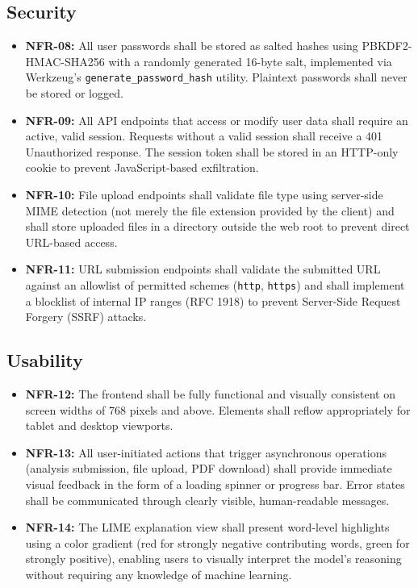 \documentclass[12pt, a4paper]{report}
\begin{document}
\subsection{Security}

\begin{itemize}[noitemsep, leftmargin=2em]
    \item \textbf{NFR-08:} All user passwords shall be stored as salted hashes using PBKDF2-HMAC-SHA256 with a randomly generated 16-byte salt, implemented via Werkzeug's \texttt{generate\_password\_hash} utility. Plaintext passwords shall never be stored or logged.
    \item \textbf{NFR-09:} All API endpoints that access or modify user data shall require an active, valid session. Requests without a valid session shall receive a 401 Unauthorized response. The session token shall be stored in an HTTP-only cookie to prevent JavaScript-based exfiltration.
    \item \textbf{NFR-10:} File upload endpoints shall validate file type using server-side MIME detection (not merely the file extension provided by the client) and shall store uploaded files in a directory outside the web root to prevent direct URL-based access.
    \item \textbf{NFR-11:} URL submission endpoints shall validate the submitted URL against an allowlist of permitted schemes (\texttt{http}, \texttt{https}) and shall implement a blocklist of internal IP ranges (RFC 1918) to prevent Server-Side Request Forgery (SSRF) attacks.
\end{itemize}

\subsection{Usability}

\begin{itemize}[noitemsep, leftmargin=2em]
    \item \textbf{NFR-12:} The frontend shall be fully functional and visually consistent on screen widths of 768 pixels and above. Elements shall reflow appropriately for tablet and desktop viewports.
    \item \textbf{NFR-13:} All user-initiated actions that trigger asynchronous operations (analysis submission, file upload, PDF download) shall provide immediate visual feedback in the form of a loading spinner or progress bar. Error states shall be communicated through clearly visible, human-readable messages.
    \item \textbf{NFR-14:} The LIME explanation view shall present word-level highlights using a color gradient (red for strongly negative contributing words, green for strongly positive), enabling users to visually interpret the model's reasoning without requiring any knowledge of machine learning.
\end{itemize}
\end{document}
